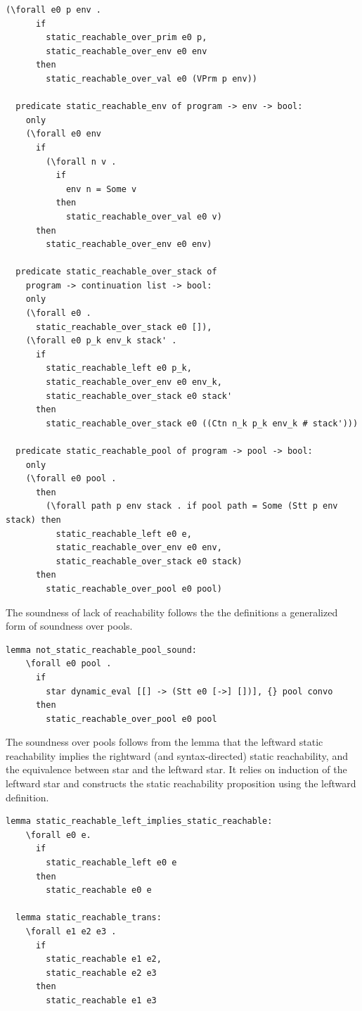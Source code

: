 \documentclass[10pt]{article}
\begin{document}
\begin{lstlisting}[language=logic, mathescape]
    (\forall e0 p env .
      if
        static_reachable_over_prim e0 p, 
        static_reachable_over_env e0 env
      then
        static_reachable_over_val e0 (VPrm p env))

  predicate static_reachable_env of program -> env -> bool:
    only
    (\forall e0 env
      if
        (\forall n v .
          if
            env n = Some v
          then
            static_reachable_over_val e0 v)
      then
        static_reachable_over_env e0 env)

  predicate static_reachable_over_stack of
    program -> continuation list -> bool:
    only
    (\forall e0 .
      static_reachable_over_stack e0 []),
    (\forall e0 p_k env_k stack' .
      if
        static_reachable_left e0 p_k, 
        static_reachable_over_env e0 env_k,
        static_reachable_over_stack e0 stack' 
      then
        static_reachable_over_stack e0 ((Ctn n_k p_k env_k # stack')))

  predicate static_reachable_pool of program -> pool -> bool:
    only
    (\forall e0 pool .
      then
        (\forall path p env stack . if pool path = Some (Stt p env stack) then 
          static_reachable_left e0 e, 
          static_reachable_over_env e0 env, 
          static_reachable_over_stack e0 stack)
      then
        static_reachable_over_pool e0 pool)

  \end{lstlisting}

The soundness of lack of reachability follows the the definitions
a generalized form of soundness over pools.

\begin{lstlisting}[language=logic, mathescape]
  lemma not_static_reachable_pool_sound:
    \forall e0 pool .
      if
        star dynamic_eval [[] -> (Stt e0 [->] [])], {} pool convo 
      then
        static_reachable_over_pool e0 pool

  \end{lstlisting}


The soundness over pools follows from the lemma that the leftward
static reachability implies the rightward (and syntax-directed) static reachability,
and the equivalence between star and the leftward star.  It relies on induction of the
leftward star and constructs the static reachability
proposition using the leftward definition.  

\begin{lstlisting}[language=logic, mathescape]
  lemma static_reachable_left_implies_static_reachable:
    \forall e0 e. 
      if
        static_reachable_left e0 e
      then
        static_reachable e0 e

  lemma static_reachable_trans:
    \forall e1 e2 e3 .
      if 
        static_reachable e1 e2,
        static_reachable e2 e3
      then
        static_reachable e1 e3
  \end{lstlisting}
\end{document}
